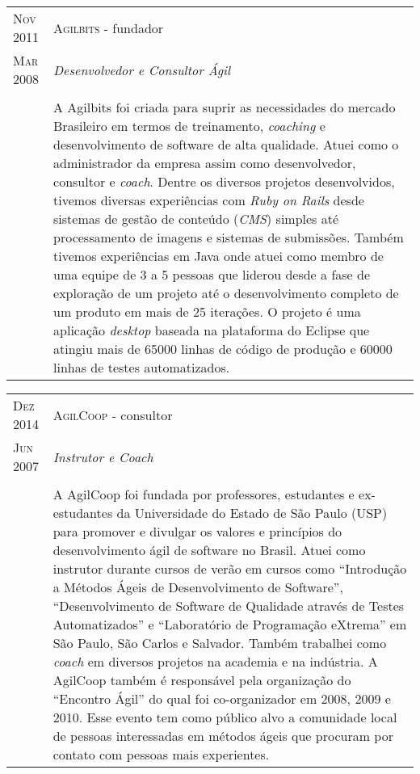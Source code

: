 \documentclass[letter,10pt]{article}
\begin{document}
\begin{tabular}{p{2.5cm}|p{13.5cm}}
  \textsc{Nov 2011} & \textsc{Agilbits} - fundador\\
  \textsc{Mar 2008}& \emph{Desenvolvedor e Consultor Ágil}\\
  &\\
  &A Agilbits foi criada para suprir as necessidades do mercado
  Brasileiro em termos de treinamento, \textit{coaching} e
  desenvolvimento de software de alta qualidade. Atuei como o
  administrador da empresa assim como desenvolvedor, consultor e
  \textit{coach}.
  Dentre os diversos projetos desenvolvidos, tivemos diversas
  experiências com \textit{Ruby on Rails} desde sistemas de gestão de
  conteúdo (\textit{CMS}) simples até processamento de imagens e
  sistemas de submissões.
  Também tivemos experiências em Java onde atuei como membro de uma
  equipe de 3 a 5 pessoas que liderou desde a fase de exploração de
  um projeto até o desenvolvimento completo de um produto em mais de
  25 iterações. O projeto é uma aplicação \textit{desktop} baseada na
  plataforma do Eclipse que atingiu mais de 65000 linhas de código de
  produção e 60000 linhas de testes automatizados.
\end{tabular}

\begin{tabular}{p{2.5cm}|p{13.5cm}}
  \textsc{Dez 2014} & \textsc{AgilCoop} - consultor\\
  \textsc{Jun 2007}& \emph{Instrutor e Coach}\\
  &\\
  &A AgilCoop foi fundada por professores, estudantes e ex-estudantes
  da Universidade do Estado de São Paulo (USP) para promover e
  divulgar os valores e princípios do desenvolvimento ágil de software
  no Brasil. Atuei como instrutor durante cursos de verão em cursos
  como ``Introdução a Métodos Ágeis de Desenvolvimento de Software'',
  ``Desenvolvimento de Software de Qualidade através de Testes
  Automatizados'' e ``Laboratório de Programação eXtrema'' em São
  Paulo, São Carlos e Salvador.
  Também trabalhei como \textit{coach} em diversos projetos na
  academia e na indústria. A AgilCoop também é responsável pela
  organização do ``Encontro Ágil'' do qual foi co-organizador em 2008,
  2009 e 2010. Esse evento tem como público alvo a comunidade local de
  pessoas interessadas em métodos ágeis que procuram por contato com
  pessoas mais experientes.
\end{tabular}
\end{document}
